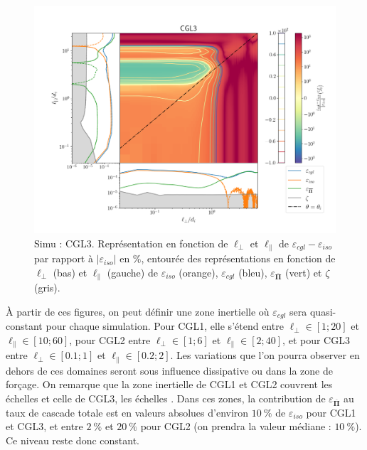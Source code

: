  \begin{figure}[!ht]
  \centering
 \includegraphics[width=0.95\linewidth,trim=1cm 1cm 0cm 2cm, clip=true]{./Mainmatter/Part_3/images_ch3/CGL3_panel_isocgl_percent}
 \cprotect\caption{Simu : CGL3. Représentation  en fonction de \ensuremath{\ell_{\perp}} et \ensuremath{\ell_{\parallel}} de \ensuremath{\varepsilon_{cgl}-\varepsilon_{iso}} par rapport à \ensuremath{|\varepsilon_{iso}|} en \ensuremath{\%}, entourée des représentations  en fonction de \ensuremath{\ell_{\perp}} (bas) et \ensuremath{\ell_{\parallel}} (gauche) de \ensuremath{\varepsilon_{iso}} (orange), \ensuremath{\varepsilon_{cgl}} (bleu),  \ensuremath{\varepsilon_{\overline{\boldsymbol{\Pi}}}} (vert) et \ensuremath{\zeta} (gris).}
 \label{fig:trip_CGL3}
 \end{figure}
 
 À partir de ces figures, on peut définir une zone inertielle où $\varepsilon_{cgl}$ sera quasi-constant pour chaque simulation. Pour CGL1, elle s'étend entre $\ell_{\perp} \in [\num{1};\num{20}]$ et $\ell_{\parallel} \in [\num{10};\num{60}]$, pour CGL2 entre $\ell_{\perp} \in [\num{1};\num{6}]$ et $\ell_{\parallel} \in [\num{2};\num{40}]$, et pour CGL3 entre $\ell_{\perp} \in [\num{0.1};\num{1}]$ et $\ell_{\parallel} \in [\num{0.2};\num{2}]$. Les variations que l'on pourra observer en dehors de ces domaines seront sous influence dissipative ou dans la zone de forçage. On remarque que la zone inertielle de CGL1 et CGL2 couvrent les échelles  et celle de CGL3, les échelles . Dans ces zones, la contribution de $\varepsilon_{\overline{\boldsymbol{\Pi}}}$ au taux de cascade totale est en valeurs absolues d'environ $\SI{10}{\%}$ de $\varepsilon_{iso}$ pour CGL1 et CGL3, et entre $\SI{2}{\%}$ et $\SI{20}{\%}$ pour CGL2 (on prendra la valeur médiane : $\SI{10}{\%}$). Ce niveau reste donc constant. 
 
